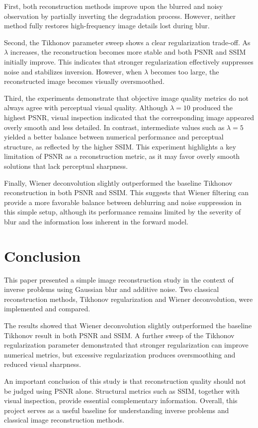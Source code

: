 \documentclass[conference]{IEEEtran}
\begin{document}
	First, both reconstruction methods improve upon the blurred and noisy observation by partially inverting the degradation process. However, neither method fully restores high-frequency image details lost during blur.
	
	Second, the Tikhonov parameter sweep shows a clear regularization trade-off. As $\lambda$ increases, the reconstruction becomes more stable and both PSNR and SSIM initially improve. This indicates that stronger regularization effectively suppresses noise and stabilizes inversion. However, when $\lambda$ becomes too large, the reconstructed image becomes visually oversmoothed.
	
	Third, the experiments demonstrate that objective image quality metrics do not always agree with perceptual visual quality. Although $\lambda = 10$ produced the highest PSNR, visual inspection indicated that the corresponding image appeared overly smooth and less detailed. In contrast, intermediate values such as $\lambda = 5$ yielded a better balance between numerical performance and perceptual structure, as reflected by the higher SSIM. This experiment highlights a key limitation of PSNR as a reconstruction metric, as it may favor overly smooth solutions that lack perceptual sharpness.
	
	Finally, Wiener deconvolution slightly outperformed the baseline Tikhonov reconstruction in both PSNR and SSIM. This suggests that Wiener filtering can provide a more favorable balance between deblurring and noise suppression in this simple setup, although its performance remains limited by the severity of blur and the information loss inherent in the forward model.
	
	\section{Conclusion}
	This paper presented a simple image reconstruction study in the context of inverse problems using Gaussian blur and additive noise. Two classical reconstruction methods, Tikhonov regularization and Wiener deconvolution, were implemented and compared.
	
	The results showed that Wiener deconvolution slightly outperformed the baseline Tikhonov result in both PSNR and SSIM. A further sweep of the Tikhonov regularization parameter demonstrated that stronger regularization can improve numerical metrics, but excessive regularization produces oversmoothing and reduced visual sharpness.
	
	An important conclusion of this study is that reconstruction quality should not be judged using PSNR alone. Structural metrics such as SSIM, together with visual inspection, provide essential complementary information. Overall, this project serves as a useful baseline for understanding inverse problems and classical image reconstruction methods.
	
\end{document}
